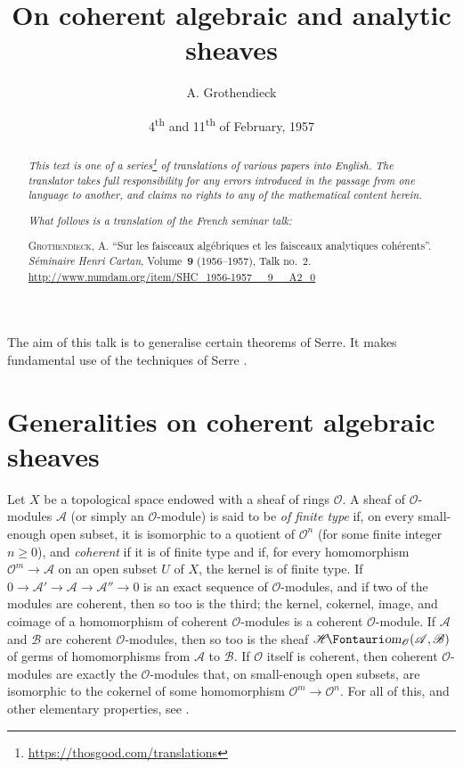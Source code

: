 \documentclass{article}
\title{On coherent algebraic and analytic sheaves}
\author{A. Grothendieck}
\date{4\textsuperscript{th} and 11\textsuperscript{th} of February, 1957}
\newcommand{\doctype}{French seminar talk}
\newcommand{\origcit}{%
  \textsc{Grothendieck, A.}
  ``Sur les faisceaux alg\'{e}briques et les faisceaux analytiques coh\'{e}rents''.
  \emph{S\'{e}minaire Henri Cartan}, Volume~\textbf{9} (1956--1957), Talk no.~2.
  {\url{http://www.numdam.org/item/SHC_1956-1957__9__A2_0}}%
}
\newcommand{\scr}[1]{{\mathscr{#1}}}
\newcommand{\shHom}{\scr{H}\textup{\kern-2.2pt{\Fontauri\slshape om}}}
\renewcommand{\geq}{\geqslant}
\newcommand{\oldpage}[1]{\marginpar{\footnotesize$\Big\vert$ \textit{p.~#1}}}
\begin{document}
\maketitle
\thispagestyle{fancy}

\renewcommand{\abstractname}{Translator's note.}

\begin{abstract}
  \renewcommand*{\thefootnote}{\fnsymbol{footnote}}
  \emph{This text is one of a series\footnote{\url{https://thosgood.com/translations}} of translations of various papers into English.}
  \emph{The translator takes full responsibility for any errors introduced in the passage from one language to another, and claims no rights to any of the mathematical content herein.}

  \medskip
  
  \emph{What follows is a translation of the \doctype:}

  \medskip\noindent
  \origcit
\end{abstract}

\setcounter{footnote}{0}

\tableofcontents
\bigskip



The aim of this talk is to generalise certain theorems of Serre.
\oldpage{2-01}
It makes fundamental use of the techniques of Serre \cite{1,2,3}.


\section{Generalities on coherent algebraic sheaves}
\label{section1}

Let $X$ be a topological space endowed with a sheaf of rings $\scr{O}$.
A sheaf of $\scr{O}$-modules $\scr{A}$ (or simply an $\scr{O}$-module) is said to be \emph{of finite type} if, on every small-enough open subset, it is isomorphic to a quotient of $\scr{O}^n$ (for some finite integer $n\geq0$), and \emph{coherent} if it is of finite type and if, for every homomorphism $\scr{O}^m\to\scr{A}$ on an open subset $U$ of $X$, the kernel is of finite type.
If $0\to\scr{A}'\to\scr{A}\to\scr{A}''\to0$ is an exact sequence of $\scr{O}$-modules, and if two of the modules are coherent, then so too is the third;
the kernel, cokernel, image, and coimage of a homomorphism of coherent $\scr{O}$-modules is a coherent $\scr{O}$-module.
If $\scr{A}$ and $\scr{B}$ are coherent $\scr{O}$-modules, then so too is the sheaf $\shHom_\scr{O}(\scr{A},\scr{B})$ of germs of homomorphisms from $\scr{A}$ to $\scr{B}$.
If $\scr{O}$ itself is coherent, then coherent $\scr{O}$-modules are exactly the $\scr{O}$-modules that, on small-enough open subsets, are isomorphic to the cokernel of some homomorphism $\scr{O}^m\to\scr{O}^n$.
For all of this, and other elementary properties, see \cite[chapitre~1, paragraphe~2]{1}.
\end{document}

